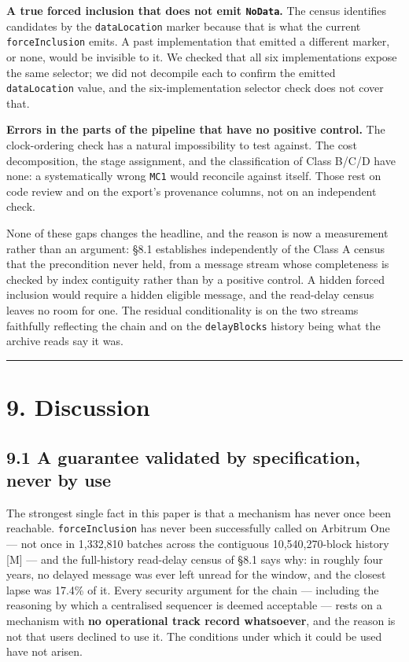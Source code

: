 \documentclass[conference]{IEEEtran}
\renewcommand{\_}{\textunderscore\allowbreak}
\begin{document}
\textbf{A true forced inclusion that does not emit \texttt{NoData}.} The
census identifies candidates by the \texttt{dataLocation} marker because
that is what the current \texttt{forceInclusion} emits. A past
implementation that emitted a different marker, or none, would be
invisible to it. We checked that all six implementations expose the same
selector; we did not decompile each to confirm the emitted
\texttt{dataLocation} value, and the six-implementation selector check
does not cover that.

\textbf{Errors in the parts of the pipeline that have no positive
control.} The clock-ordering check has a natural impossibility to test
against. The cost decomposition, the stage assignment, and the
classification of Class B/C/D have none: a systematically wrong
\texttt{M\_C1} would reconcile against itself. Those rest on code review
and on the export's provenance columns, not on an independent check.

None of these gaps changes the headline, and the reason is now a
measurement rather than an argument: §8.1 establishes independently of
the Class A census that the precondition never held, from a message
stream whose completeness is checked by index contiguity rather than by
a positive control. A hidden forced inclusion would require a hidden
eligible message, and the read-delay census leaves no room for one. The
residual conditionality is on the two streams faithfully reflecting the
chain and on the \texttt{delayBlocks} history being what the archive
reads say it was.

\begin{center}\rule{0.5\linewidth}{0.5pt}\end{center}

\section{9. Discussion}\label{discussion}

\subsection{9.1 A guarantee validated by specification, never by
use}\label{a-guarantee-validated-by-specification-never-by-use}

The strongest single fact in this paper is that a mechanism has never
once been reachable. \texttt{forceInclusion} has never been successfully
called on Arbitrum One --- not once in 1,332,810 batches across the
contiguous 10,540,270-block history {[}M{]} --- and the full-history
read-delay census of §8.1 says why: in roughly four years, no delayed
message was ever left unread for the window, and the closest lapse was
17.4\% of it. Every security argument for the chain --- including the
reasoning by which a centralised sequencer is deemed acceptable ---
rests on a mechanism with \textbf{no operational track record
whatsoever}, and the reason is not that users declined to use it. The
conditions under which it could be used have not arisen.
\end{document}
